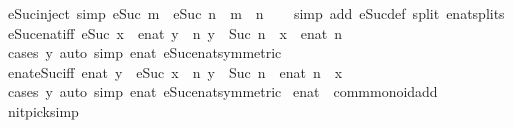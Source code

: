 \begin{isabellebody}
\isamarkupfalse%
\ eSuc{\isacharunderscore}inject\ {\isacharbrackleft}simp{\isacharbrackright}{\isacharcolon}\ {\isachardoublequoteopen}eSuc\ m\ {\isacharequal}\ eSuc\ n\ {\isasymlongleftrightarrow}\ m\ {\isacharequal}\ n{\isachardoublequoteclose}\isanewline
%
\isadelimproof
\ \ %
\endisadelimproof
%
\isatagproof
{}\isamarkupfalse%
\ {\isacharparenleft}simp\ add{\isacharcolon}\ eSuc{\isacharunderscore}def\ split{\isacharcolon}\ enat{\isachardot}splits{\isacharparenright}%
\endisatagproof
{\isafoldproof}%
%
\isadelimproof
\isanewline
%
\endisadelimproof
\isanewline
{}\isamarkupfalse%
\ eSuc{\isacharunderscore}enat{\isacharunderscore}iff{\isacharcolon}\ {\isachardoublequoteopen}eSuc\ x\ {\isacharequal}\ enat\ y\ {\isasymlongleftrightarrow}\ {\isacharparenleft}{\isasymexists}n{\isachardot}\ y\ {\isacharequal}\ Suc\ n\ {\isasymand}\ x\ {\isacharequal}\ enat\ n{\isacharparenright}{\isachardoublequoteclose}\isanewline
%
\isadelimproof
\ \ %
\endisadelimproof
%
\isatagproof
{}\isamarkupfalse%
\ {\isacharparenleft}cases\ y{\isacharparenright}\ {\isacharparenleft}auto\ simp{\isacharcolon}\ enat{\isacharunderscore}{}\ eSuc{\isacharunderscore}enat{\isacharbrackleft}symmetric{\isacharbrackright}{\isacharparenright}%
\endisatagproof
{\isafoldproof}%
%
\isadelimproof
\isanewline
%
\endisadelimproof
\isanewline
{}\isamarkupfalse%
\ enat{\isacharunderscore}eSuc{\isacharunderscore}iff{\isacharcolon}\ {\isachardoublequoteopen}enat\ y\ {\isacharequal}\ eSuc\ x\ {\isasymlongleftrightarrow}\ {\isacharparenleft}{\isasymexists}n{\isachardot}\ y\ {\isacharequal}\ Suc\ n\ {\isasymand}\ enat\ n\ {\isacharequal}\ x{\isacharparenright}{\isachardoublequoteclose}\isanewline
%
\isadelimproof
\ \ %
\endisadelimproof
%
\isatagproof
{}\isamarkupfalse%
\ {\isacharparenleft}cases\ y{\isacharparenright}\ {\isacharparenleft}auto\ simp{\isacharcolon}\ enat{\isacharunderscore}{}\ eSuc{\isacharunderscore}enat{\isacharbrackleft}symmetric{\isacharbrackright}{\isacharparenright}%
\endisatagproof
{\isafoldproof}%
%
\isadelimproof
%
\endisadelimproof
%
\isadelimdocument
%
\endisadelimdocument
%
\isatagdocument
%
\isamarkuptrue%
%
\endisatagdocument
{\isafolddocument}%
%
\isadelimdocument
%
\endisadelimdocument
{}\isamarkupfalse%
\ enat\ {\isacharcolon}{\isacharcolon}\ comm{\isacharunderscore}monoid{\isacharunderscore}add\isanewline
{}\isanewline
\isanewline
{}\isamarkupfalse%
\ {\isacharbrackleft}nitpick{\isacharunderscore}simp{\isacharbrackright}{\isacharcolon}\isanewline

\end{isabellebody}
